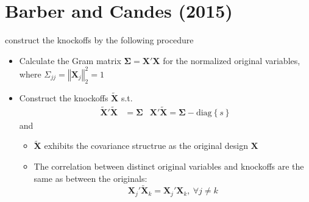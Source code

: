 \documentclass[twoside]{article}
\begin{document}
\section{Barber and Candes (2015)}
\citet{Barber2015} construct the knockoffs by the following procedure
\begin{itemize}
    \item Calculate the Gram matrix $\boldsymbol{\Sigma}=\mathbf{X'X}$ for the normalized original variables, where $\Sigma_{jj}=\left\Vert \mathbf{X}_j \right\Vert^2_2 = 1$
    \item Construct the knockoffs $\tilde{\mathbf{X}}$ s.t. 
    \begin{align*}
        \tilde{\mathbf{X}}'\tilde{\mathbf{X}} &= \boldsymbol{\Sigma} & {\mathbf{X}}'\tilde{\mathbf{X}} = \boldsymbol{\Sigma} -\mathrm{diag}\left\{s\right\}
    \end{align*}
    and
    \begin{itemize}
        \item $\tilde{\mathbf{X}}$ exhibits the  covariance structrue as the original design $\mathbf{X}$
        \item The correlation between distinct original variables and knockoffs are the same as between the originals: $$ \mathbf{X}_j'\tilde{\mathbf{X}}_k = \mathbf{X}_j'{\mathbf{X}}_k,\ \forall j\neq k $$
    \end{itemize}
\end{itemize}

\newpage


\end{document}
